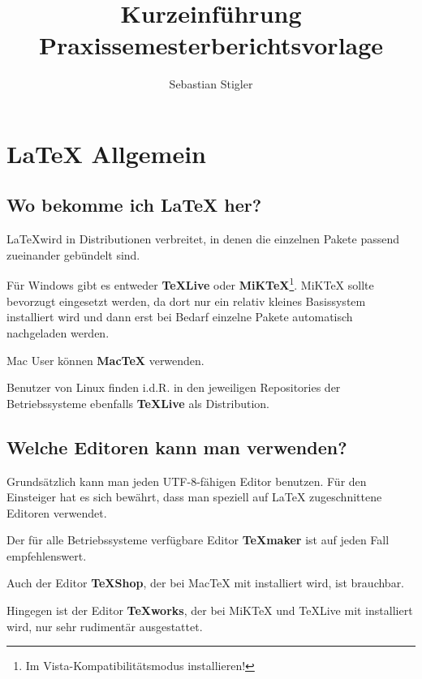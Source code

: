 \documentclass[pdftex,abstracton,a4paper]{scrartcl}
\title{Kurzeinführung Praxissemesterberichtsvorlage}
\author{Sebastian Stigler}
\begin{document}
\maketitle

\tableofcontents

\section{\LaTeX{} Allgemein}

\subsection{Wo bekomme ich \LaTeX{} her?}
\LaTeX wird in Distributionen verbreitet, in denen die einzelnen Pakete passend zueinander gebündelt sind.

Für Windows gibt es entweder \textbf{\TeX{}Live}\autocite{tug:texlive} oder \textbf{MiK\TeX}\footnote{Im Vista-Kompatibilitätsmodus installieren!}\autocite{schenk:miktex}. 
MiK\TeX{} sollte bevorzugt eingesetzt werden, da dort nur ein relativ kleines Basissystem installiert wird und dann erst bei Bedarf einzelne Pakete automatisch nachgeladen werden.

Mac User können \textbf{Mac\TeX}\autocite{tug:mactex} verwenden.

Benutzer von Linux finden i.d.R. in den jeweiligen Repositories der Betriebssysteme ebenfalls \textbf{\TeX{}Live}\autocite{tug:texlive} als Distribution.

\subsection{Welche Editoren kann man verwenden?}

Grundsätzlich kann man jeden UTF-8-fähigen Editor benutzen. Für den Einsteiger hat es sich bewährt, dass man speziell auf \LaTeX{} zugeschnittene Editoren verwendet.

Der für alle Betriebssysteme verfügbare Editor \textbf{\TeX{}maker}\autocite{brachet:texmaker} ist auf jeden Fall empfehlenswert.

Auch der Editor \textbf{\TeX{}Shop}, der bei Mac\TeX{} mit installiert wird, ist brauchbar.

Hingegen ist der Editor \textbf{\TeX{}works}, der bei MiK\TeX{} und \TeX{}Live mit installiert wird, nur sehr rudimentär ausgestattet. 

\end{document}
